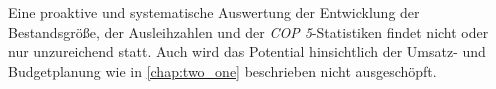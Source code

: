 Eine proaktive und systematische Auswertung der Entwicklung der Bestandsgröße, der Ausleihzahlen und der \textit{\acrshort{COP 5}}-Statistiken findet nicht
oder nur unzureichend statt. Auch wird das Potential hinsichtlich der Umsatz- und Budgetplanung wie in \autoref{chap:two_one} beschrieben
nicht ausgeschöpft.



